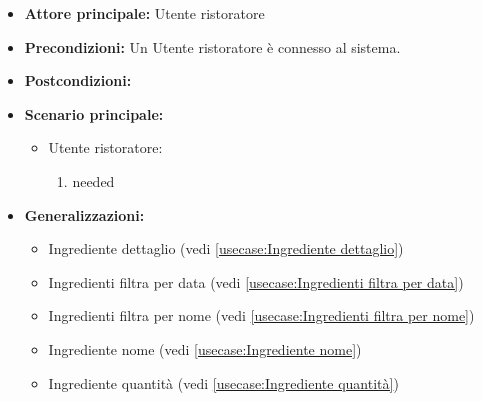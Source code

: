 \label{usecase:Ingredienti lista}
\begin{itemize}
\item \textbf{Attore principale:} Utente ristoratore
\item \textbf{Precondizioni:}
Un Utente ristoratore è connesso al sistema.
\item \textbf{Postcondizioni:}
\item \textbf{Scenario principale:}
\begin{itemize}
\item Utente ristoratore:
\begin{enumerate}
\item needed
\end{enumerate}
\end{itemize}
\item \textbf{Generalizzazioni:}
\begin{itemize}
\item Ingrediente dettaglio (vedi \autoref{usecase:Ingrediente dettaglio})\item Ingredienti filtra per data (vedi \autoref{usecase:Ingredienti filtra per data})\item Ingredienti filtra per nome (vedi \autoref{usecase:Ingredienti filtra per nome})\item Ingrediente nome (vedi \autoref{usecase:Ingrediente nome})\item Ingrediente quantità (vedi \autoref{usecase:Ingrediente quantità})
\end{itemize}
\end{itemize}